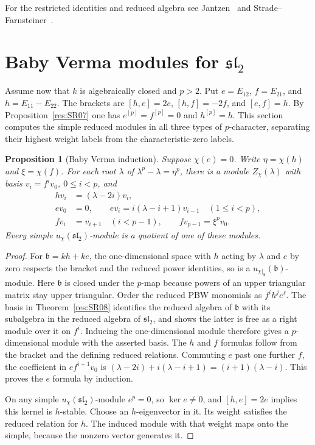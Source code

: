 \documentclass[11pt,oneside,openany]{book}
\newtheorem{proposition}[theorem]{Proposition}
\theoremstyle{definition}
\theoremstyle{remark}
\begin{document}
For the restricted identities and reduced algebra see
Jantzen~\cite[Sections A.1--A.3 and A.7, PDF pp.~1--3 and 4--5]{jantzen-modular}
and Strade--Farnsteiner~\cite[Sections 2.1, 2.5 and 5.3]{stradefarnsteiner}.

\section{Baby Verma modules for \texorpdfstring{\(\mathfrak{sl}_2\)}{sl(2)}}

Assume now that \(k\) is algebraically closed and \(p>2\).
Put \(e=E_{12}\), \(f=E_{21}\), and \(h=E_{11}-E_{22}\).
The brackets are \([h,e]=2e\), \([h,f]=-2f\), and
\([e,f]=h\). By Proposition~\ref{res:SR07} one has
\(e^{[p]}=f^{[p]}=0\) and \(h^{[p]}=h\).
This section computes the simple reduced modules in all
three types of \(p\)-character, separating their highest
weight labels from the characteristic-zero labels.

\begin{proposition}[Baby Verma induction]
\label{res:SR10}
Suppose \(\chi(e)=0\). Write \(\eta=\chi(h)\) and
\(\xi=\chi(f)\). For each root \(\lambda\) of
\(\lambda^p-\lambda=\eta^p\), there is a module \(Z_\chi(\lambda)\)
with basis \(v_i=f^i v_0\), \(0\le i<p\), and
\[
\begin{aligned}
 hv_i&=(\lambda-2i)v_i,\\
 ev_0&=0,\qquad ev_i=i(\lambda-i+1)v_{i-1}\quad(1\le i<p),\\
 fv_i&=v_{i+1}\quad(i<p-1),\qquad fv_{p-1}=\xi^p v_0.
\end{aligned}
\]
Every simple \(u_\chi(\mathfrak{sl}_2)\)-module is a
quotient of one of these modules.
\end{proposition}

\begin{proof}
For \(\mathfrak b=k h+k e\), the one-dimensional space
with \(h\) acting by \(\lambda\) and \(e\) by zero respects
the bracket and the reduced power identities, so is a
\(u_{\chi|_{\mathfrak b}}(\mathfrak b)\)-module. Here
\(\mathfrak b\) is closed under the \(p\)-map because powers
of an upper triangular matrix stay upper triangular.
Order the reduced PBW monomials as \(f^i h^j e^\ell\).
The basis in Theorem~\ref{res:SR08} identifies the reduced
algebra of \(\mathfrak b\) with its subalgebra in the
reduced algebra of \(\mathfrak{sl}_2\), and shows the
latter is free as a right module over it on \(f^i\).
Inducing the one-dimensional module therefore gives a
\(p\)-dimensional module with the asserted basis.
The \(h\) and \(f\) formulas follow from the bracket
and the defining reduced relations. Commuting \(e\)
past one further \(f\), the coefficient in
\(e f^{i+1}v_0\) is
\((\lambda-2i)+i(\lambda-i+1)=(i+1)(\lambda-i)\).
This proves the \(e\) formula by induction.

On any simple \(u_\chi(\mathfrak{sl}_2)\)-module \(e^p=0\), so
\(\ker e\ne0\), and \([h,e]=2e\) implies this kernel
is \(h\)-stable. Choose an \(h\)-eigenvector in it.
Its weight satisfies the reduced relation for \(h\).
The induced module with that weight maps onto the simple,
because the nonzero vector generates it.
\end{proof}
\end{document}
